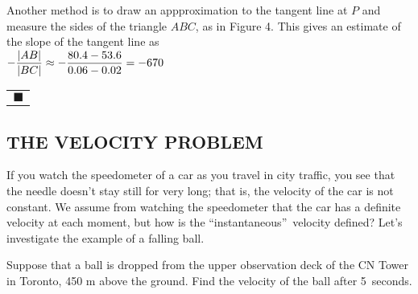 \documentclass{sebase}
\begin{document}
Another method is to draw an appproximation to the tangent line at $P$ and
measure the sides of the triangle $ABC$, as in Figure 4. This gives an
estimate of the slope of the tangent line as%
\\[8pt]
$\hspace*{\fill}-\dfrac{\left\vert AB\right\vert }{\left\vert BC\right\vert }%
\approx -\dfrac{80.4-53.6}{0.06-0.02}=-670\hfill $%
\begin{tabular}{l}
\\ 
$\blacksquare $%
\end{tabular}%
\vspace{15pt}

\subsection{THE VELOCITY PROBLEM}

If you watch the speedometer of a car as you travel in city traffic, you see
that the nee\nolinebreak dle doesn't stay still for very long; that is, the
velocity of the car is not constant. We assume from watching the speedometer
that the car has a definite velocity at each moment, but how is the
\textquotedblleft instantaneous\textquotedblright\ velocity defined? Let's
investigate the ex\nolinebreak ample of a falling ball.

\begin{Example}[3]
\VIDEO%
%
Suppose that a ball is dropped from the upper observation deck
of the CN Tower in Toronto, 450 m above the ground. Find the velocity of the
ball after 5~seconds.
\end{Example}
\end{document}
